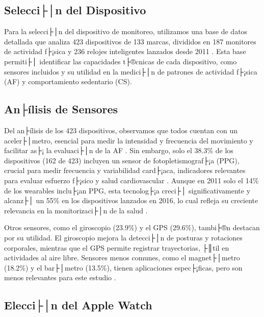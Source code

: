 \subsection{Selecci├│n del Dispositivo}
\label{subsec:seleccion_dispositivo}

Para la selecci├│n del dispositivo de monitoreo, utilizamos una base de datos detallada que analiza 423 dispositivos de 133 marcas, divididos en 187 monitores de actividad f├¡sica y 236 relojes inteligentes lanzados desde 2011 \citep{Henriksen2021ReplicationData}. Esta base permiti├│ identificar las capacidades t├®cnicas de cada dispositivo, como sensores incluidos y su utilidad en la medici├│n de patrones de actividad f├¡sica (AF) y comportamiento sedentario (CS).

\subsection{An├ílisis de Sensores}
\label{subsec:analisis_sensores}

Del an├ílisis de los 423 dispositivos, observamos que todos cuentan con un aceler├│metro, esencial para medir la intensidad y frecuencia del movimiento y facilitar as├¡ la evaluaci├│n de la AF \citep{Henriksen2021ReplicationData}. Sin embargo, solo el 38.3\% de los dispositivos (162 de 423) incluyen un sensor de fotopletismograf├¡a (PPG), crucial para medir frecuencia y variabilidad card├¡aca, indicadores relevantes para evaluar esfuerzo f├¡sico y salud cardiovascular \citep{Pinto2023Physiology}. Aunque en 2011 solo el 14\% de los wearables inclu├¡an PPG, esta tecnolog├¡a creci├│ significativamente y alcanz├│ un 55\% en los dispositivos lanzados en 2016, lo cual refleja su creciente relevancia en la monitorizaci├│n de la salud \citep{Henriksen2018}.

Otros sensores, como el giroscopio (23.9\%) y el GPS (29.6\%), tambi├®n destacan por su utilidad. El giroscopio mejora la detecci├│n de posturas y rotaciones corporales, mientras que el GPS permite registrar trayectorias, ├║til en actividades al aire libre. Sensores menos comunes, como el magnet├│metro (18.2\%) y el bar├│metro (13.5\%), tienen aplicaciones espec├¡ficas, pero son menos relevantes para este estudio \citep{Henriksen2018}.

\subsection{Elecci├│n del Apple Watch}
\label{subsec:eleccion_apple_watch}

